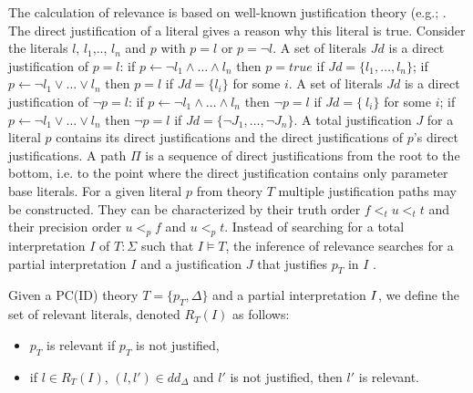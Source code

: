 The calculation of relevance is based on well-known justification theory (e.g.; \cite{Denecker93, Denecker2015}.
The direct justification of a literal gives a reason why this literal is true.
Consider the literals $l$, $l_1$,.., $l_n$ and $p$ with $p=l$ or $p=\neg l$.
A set of literals $Jd$ is a direct justification of $p = l$:
if $p \leftarrow \neg l_1 \wedge \ldots \wedge l_n$ then $p = true$ if $Jd = \{l_1, \ldots ,l_n\}$;
if $p \leftarrow \neg l_1 \vee \ldots \vee l_n$ then $p=l$ if $Jd = \{l_i\}$ for some $i$.
A set of literals $Jd$ is a direct justification of $\neg p = l$:
if $p \leftarrow \neg l_1 \wedge \ldots \wedge l_n$ then $\neg p = l$ if $Jd = \{~l_i\}$ for some $i$;  
if $p \leftarrow \neg l_1 \vee \ldots \vee l_n$ then $\neg p = l$ if $Jd = \{\neg J_1,  \ldots , \neg J_n\}$.
A total justification $J$ for a literal $p$ contains its direct justifications and the direct justifications of $p$'s direct justifications.
A path $\Pi$ is a sequence of direct justifications from the root to the bottom, i.e. to the point where the direct justification contains only parameter base literals.
For a given literal $p$ from theory $T$ multiple justification paths may be constructed.
They can be characterized by their truth order $f <_t u <_t t$ and their precision order  $u<_p f$ and $u<_p t$.
Instead of searching for a total interpretation $I$ of $T:\Sigma$ such that $I \models T$, the inference of relevance searches for a partial interpretation $I$ and a justification $J$ that justifies $p_T$ in $I$ \cite{Jansen2016}.
\begin{definition}
\label{def1}
\cite{Jansen2016}
Given a PC(ID) theory $T = \{p_T , \Delta \}$ and a partial interpretation $I$, we define the set of relevant literals, denoted $R_T(I)$ as follows:
\begin{itemize}
    \item $p_T$ is relevant if $p_T$ is not justified,
    \item if $l \in R_T(I)$, $(l,l') \in dd_\Delta$ and $l'$ is not justified, then $l'$ is relevant.
\end{itemize}
\end{definition}

